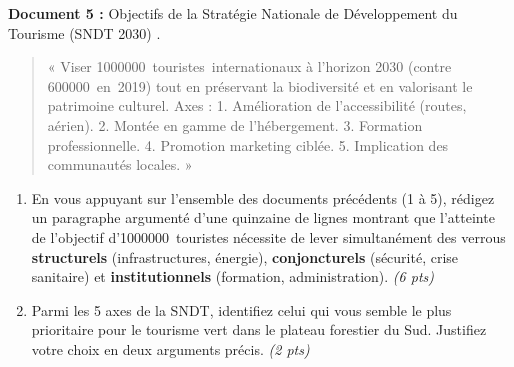 \documentclass[11pt]{article}
\begin{document}
\begin{exercice}
\textbf{Document 5 :} Objectifs de la \og Stratégie Nationale de Développement du Tourisme (SNDT 2030) \fg{}.
\begin{quote}
« Viser \SI{1 000 000}{touristes internationaux} à l'horizon 2030 (contre \SI{600 000}{en 2019}) tout en préservant la biodiversité et en valorisant le patrimoine culturel. Axes : 1. Amélioration de l'accessibilité (routes, aérien). 2. Montée en gamme de l'hébergement. 3. Formation professionnelle. 4. Promotion marketing ciblée. 5. Implication des communautés locales. »
\end{quote}

\begin{enumerate}
    \item En vous appuyant sur l'ensemble des documents précédents (1 à 5), rédigez un paragraphe argumenté d'une quinzaine de lignes montrant que l'atteinte de l'objectif d'\SI{1 000 000}{touristes} nécessite de lever simultanément des verrous \textbf{structurels} (infrastructures, énergie), \textbf{conjoncturels} (sécurité, crise sanitaire) et \textbf{institutionnels} (formation, administration). \textit{(6 pts)}
    \item Parmi les 5 axes de la SNDT, identifiez celui qui vous semble le plus prioritaire pour le tourisme vert dans le plateau forestier du Sud. Justifiez votre choix en deux arguments précis. \textit{(2 pts)}
\end{enumerate}
\end{exercice}
\end{document}
